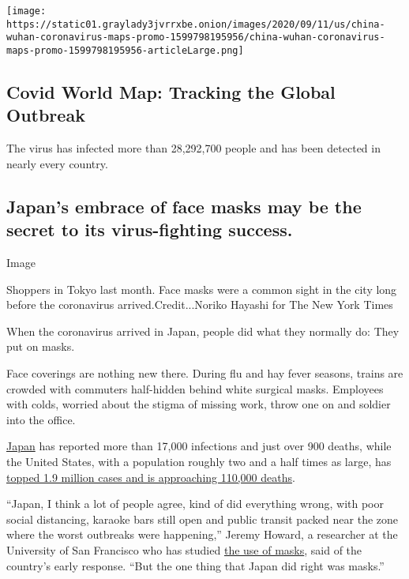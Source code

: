 \href{https://www.nytimes3xbfgragh.onion/interactive/2020/world/coronavirus-maps.html}{}

\texttt{[image: https://static01.graylady3jvrrxbe.onion/images/2020/09/11/us/china-wuhan-coronavirus-maps-promo-1599798195956/china-wuhan-coronavirus-maps-promo-1599798195956-articleLarge.png]}

\hypertarget{covid-world-map-tracking-the-global-outbreak}{%
\subsection{Covid World Map: Tracking the Global
Outbreak}\label{covid-world-map-tracking-the-global-outbreak}}

The virus has infected more than 28,292,700 people and has been detected
in nearly every country.

\hypertarget{japans-embrace-of-face-masks-may-be-the-secret-to-its-virus-fighting-success}{%
\subsection{Japan's embrace of face masks may be the secret to its
virus-fighting
success.}\label{japans-embrace-of-face-masks-may-be-the-secret-to-its-virus-fighting-success}}

Image

Shoppers in Tokyo last month. Face masks were a common sight in the city
long before the coronavirus arrived.Credit...Noriko Hayashi for The New
York Times

When the coronavirus arrived in Japan, people did what they normally do:
They put on masks.

Face coverings are nothing new there. During flu and hay fever seasons,
trains are crowded with commuters half-hidden behind white surgical
masks. Employees with colds, worried about the stigma of missing work,
throw one on and soldier into the office.

\href{https://www.nytimes3xbfgragh.onion/interactive/2020/world/coronavirus-maps.html\#countries}{Japan}
has reported more than 17,000 infections and just over 900 deaths, while
the United States, with a population roughly two and a half times as
large, has
\href{https://www.nytimes3xbfgragh.onion/interactive/2020/us/coronavirus-us-cases.html}{topped
1.9 million cases and is approaching 110,000 deaths}.

``Japan, I think a lot of people agree, kind of did everything wrong,
with poor social distancing, karaoke bars still open and public transit
packed near the zone where the worst outbreaks were happening,'' Jeremy
Howard, a researcher at the University of San Francisco who has studied
\href{https://www.preprints.org/manuscript/202004.0203/v2}{the use of
masks}, said of the country's early response. ``But the one thing that
Japan did right was masks.''

